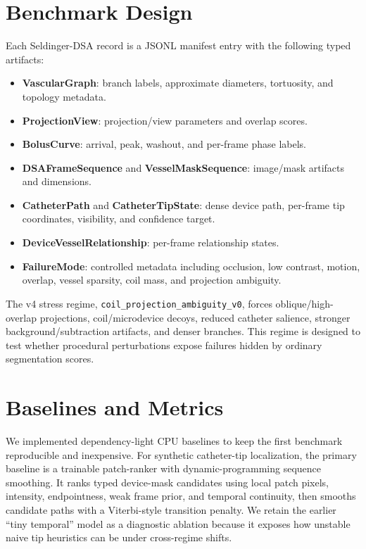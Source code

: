 \documentclass[10pt]{article}
\begin{document}
\section{Benchmark Design}
Each Seldinger-DSA record is a JSONL manifest entry with the following typed artifacts:
\begin{itemize}[leftmargin=*]
  \item \textbf{VascularGraph}: branch labels, approximate diameters, tortuosity, and topology metadata.
  \item \textbf{ProjectionView}: projection/view parameters and overlap scores.
  \item \textbf{BolusCurve}: arrival, peak, washout, and per-frame phase labels.
  \item \textbf{DSAFrameSequence} and \textbf{VesselMaskSequence}: image/mask artifacts and dimensions.
  \item \textbf{CatheterPath} and \textbf{CatheterTipState}: dense device path, per-frame tip coordinates, visibility, and confidence target.
  \item \textbf{DeviceVesselRelationship}: per-frame relationship states.
  \item \textbf{FailureMode}: controlled metadata including occlusion, low contrast, motion, overlap, vessel sparsity, coil mass, and projection ambiguity.
\end{itemize}

The v4 stress regime, \texttt{coil\_projection\_ambiguity\_v0}, forces oblique/high-overlap projections, coil/microdevice decoys, reduced catheter salience, stronger background/subtraction artifacts, and denser branches. This regime is designed to test whether procedural perturbations expose failures hidden by ordinary segmentation scores.

\section{Baselines and Metrics}
We implemented dependency-light CPU baselines to keep the first benchmark reproducible and inexpensive. For synthetic catheter-tip localization, the primary baseline is a trainable patch-ranker with dynamic-programming sequence smoothing. It ranks typed device-mask candidates using local patch pixels, intensity, endpointness, weak frame prior, and temporal continuity, then smooths candidate paths with a Viterbi-style transition penalty. We retain the earlier ``tiny temporal'' model as a diagnostic ablation because it exposes how unstable naive tip heuristics can be under cross-regime shifts.
\end{document}
